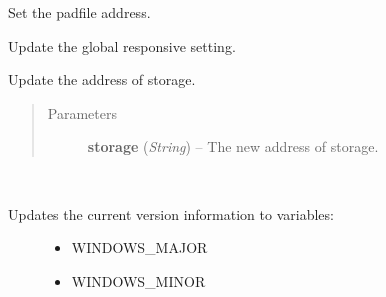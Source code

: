 \documentclass[letterpaper,10pt,english]{sphinxmanual}
\begin{document}

\begin{fulllineitems}
\label{diwavars:diwavars.update_padfile}
Set the padfile address.

\end{fulllineitems}


\begin{fulllineitems}
\label{diwavars:diwavars.update_responsive}
Update the global responsive setting.

\end{fulllineitems}


\begin{fulllineitems}
\label{diwavars:diwavars.update_storage}
Update the address of storage.
\begin{quote}\begin{description}
\item[{Parameters}] \leavevmode
\textbf{storage} (\emph{String}) -- The new address of storage.

\end{description}\end{quote}

\end{fulllineitems}


\begin{fulllineitems}
\label{diwavars:diwavars.update_windows_version}~\begin{description}
\item[{Updates the current version information to variables:}] \leavevmode\begin{itemize}
\item {} 
WINDOWS\_MAJOR

\item {} 
WINDOWS\_MINOR

\end{itemize}

\end{description}

\end{fulllineitems}
\end{document}
